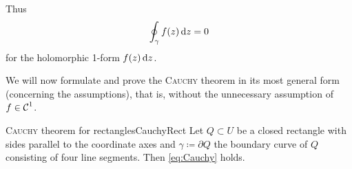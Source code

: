 \documentclass[a4paper,english]{article}
\begin{document}
Thus
\begin{equation*}
    \oint_{\gamma} f(z) \mathop{}\!\mathrm{d}{z}
    = 0
\end{equation*}
for the holomorphic 1-form $f(z) \mathop{}\!\mathrm{d}{z}$.

We will now formulate and prove the \textsc{Cauchy} theorem in its most general form (concerning the assumptions), that is, without the unnecessary assumption of $f \in \operatorname{\mathcal{C}}^1$.

\begin{thm}{\textsc{Cauchy} theorem for rectangles}{CauchyRect}
    Let $Q \subset U$ be a closed rectangle with sides parallel to the coordinate axes and $\gamma \coloneqq \partial Q$ the boundary curve of $Q$ consisting of four line segments.
    Then \eqref{eq:Cauchy} holds.
\end{thm}
\end{document}
